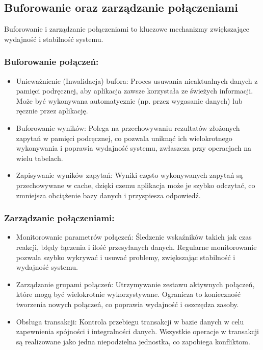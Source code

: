 \documentclass[letterpaper,10pt,polish]{sphinxmanual}
\begin{document}
\subsection{Buforowanie oraz zarządzanie połączeniami}
\label{\detokenize{rozdzial2/Wydajnosc_Skalowanie_i_Replikacja/index:buforowanie-oraz-zarzadzanie-polaczeniami}}
\sphinxAtStartPar
Buforowanie i zarządzanie połączeniami to kluczowe mechanizmy zwiększające wydajność i stabilność systemu.


\subsubsection{Buforowanie połączeń:}
\label{\detokenize{rozdzial2/Wydajnosc_Skalowanie_i_Replikacja/index:buforowanie-polaczen}}\begin{itemize}
\item {} 
\sphinxAtStartPar
Unieważnienie (Inwalidacja) bufora: Proces usuwania nieaktualnych danych z pamięci podręcznej, aby aplikacja zawsze korzystała ze świeżych informacji. Może być wykonywana automatycznie (np. przez wygasanie danych) lub ręcznie przez aplikację.

\item {} 
\sphinxAtStartPar
Buforowanie wyników: Polega na przechowywaniu rezultatów złożonych zapytań w pamięci podręcznej, co pozwala uniknąć ich wielokrotnego wykonywania i poprawia wydajność systemu, zwłaszcza przy operacjach na wielu tabelach.

\item {} 
\sphinxAtStartPar
Zapisywanie wyników zapytań: Wyniki często wykonywanych zapytań są przechowywane w cache, dzięki czemu aplikacja może je szybko odczytać, co zmniejsza obciążenie bazy danych i przyspiesza odpowiedź.

\end{itemize}


\subsubsection{Zarządzanie połączeniami:}
\label{\detokenize{rozdzial2/Wydajnosc_Skalowanie_i_Replikacja/index:zarzadzanie-polaczeniami}}\begin{itemize}
\item {} 
\sphinxAtStartPar
Monitorowanie parametrów połączeń: Śledzenie wskaźników takich jak czas reakcji, błędy łączenia i ilość przesyłanych danych. Regularne monitorowanie pozwala szybko wykrywać i usuwać problemy, zwiększając stabilność i wydajność systemu.

\item {} 
\sphinxAtStartPar
Zarządzanie grupami połączeń: Utrzymywanie zestawu aktywnych połączeń, które mogą być wielokrotnie wykorzystywane. Ogranicza to konieczność tworzenia nowych połączeń, co poprawia wydajność i oszczędza zasoby.

\item {} 
\sphinxAtStartPar
Obsługa transakcji: Kontrola przebiegu transakcji w bazie danych w celu zapewnienia spójności i integralności danych. Wszystkie operacje w transakcji są realizowane jako jedna niepodzielna jednostka, co zapobiega konfliktom.

\end{itemize}
\end{document}
